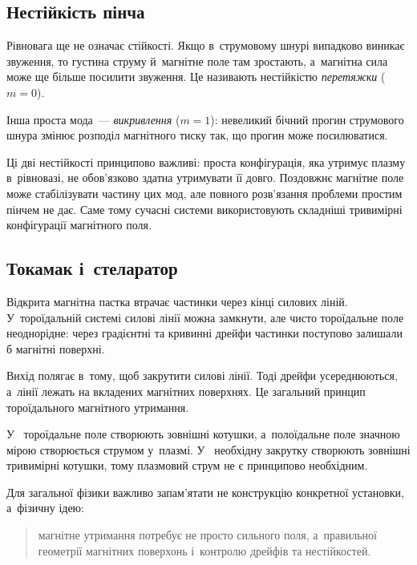 \subsection*{Нестійкість пінча}



Рівновага ще не означає стійкості. Якщо в~струмовому шнурі випадково виникає звуження, то
густина струму й~магнітне поле там зростають, а~магнітна сила може ще більше посилити
звуження. Це називають нестійкістю \emph{перетяжки} ($m=0$).

Інша проста мода~--- \emph{викривлення} ($m=1$): невеликий бічний прогин струмового шнура
змінює розподіл магнітного тиску так, що прогин може посилюватися.

Ці дві нестійкості принципово важливі: проста конфігурація, яка утримує плазму
в~рівновазі, не обов'язково здатна утримувати її довго. Поздовжнє магнітне поле може
стабілізувати частину цих мод, але повного розв'язання проблеми простим пінчем не дає.
Саме тому сучасні системи використовують складніші тривимірні конфігурації магнітного
поля.



\subsection*{Токамак і~стеларатор}



Відкрита магнітна пастка втрачає частинки через кінці силових ліній. У~тороїдальній
системі силові лінії можна замкнути, але чисто тороїдальне поле неоднорідне: через
градієнтні та кривинні дрейфи частинки поступово залишали б магнітні поверхні.

Вихід полягає в~тому, щоб закрутити силові лінії. Тоді дрейфи усереднюються, а~лінії
лежать на вкладених магнітних поверхнях. Це загальний принцип тороїдального магнітного
утримання.

У~ тороїдальне поле створюють зовнішні котушки, а~полоїдальне поле значною
мірою створюється струмом у~плазмі. У~ необхідну закрутку створюють
зовнішні тривимірні котушки, тому плазмовий струм не є принципово необхідним.

Для загальної фізики важливо запам'ятати не конструкцію конкретної установки, а~фізичну
ідею:
\begin{quote}
	магнітне утримання потребує не просто сильного поля, а~правильної геометрії магнітних
	поверхонь і~контролю дрейфів та нестійкостей.
\end{quote}



